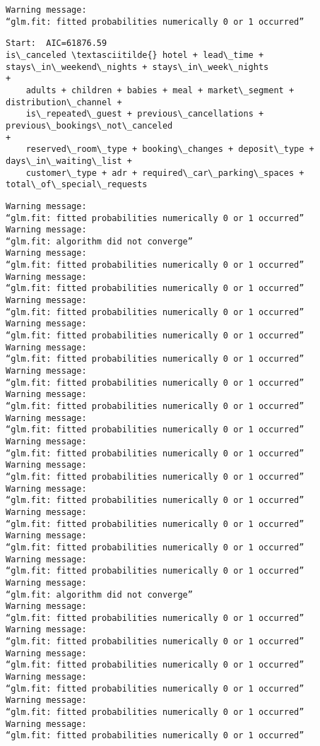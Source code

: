 \documentclass[11pt]{article}
\begin{document}
    \begin{Verbatim}[commandchars=\\\{\}]
Warning message:
“glm.fit: fitted probabilities numerically 0 or 1 occurred”
    \end{Verbatim}

    \begin{Verbatim}[commandchars=\\\{\}]
Start:  AIC=61876.59
is\_canceled \textasciitilde{} hotel + lead\_time + stays\_in\_weekend\_nights + stays\_in\_week\_nights
+
    adults + children + babies + meal + market\_segment + distribution\_channel +
    is\_repeated\_guest + previous\_cancellations + previous\_bookings\_not\_canceled
+
    reserved\_room\_type + booking\_changes + deposit\_type + days\_in\_waiting\_list +
    customer\_type + adr + required\_car\_parking\_spaces +
total\_of\_special\_requests

    \end{Verbatim}

    \begin{Verbatim}[commandchars=\\\{\}]
Warning message:
“glm.fit: fitted probabilities numerically 0 or 1 occurred”
Warning message:
“glm.fit: algorithm did not converge”
Warning message:
“glm.fit: fitted probabilities numerically 0 or 1 occurred”
Warning message:
“glm.fit: fitted probabilities numerically 0 or 1 occurred”
Warning message:
“glm.fit: fitted probabilities numerically 0 or 1 occurred”
Warning message:
“glm.fit: fitted probabilities numerically 0 or 1 occurred”
Warning message:
“glm.fit: fitted probabilities numerically 0 or 1 occurred”
Warning message:
“glm.fit: fitted probabilities numerically 0 or 1 occurred”
Warning message:
“glm.fit: fitted probabilities numerically 0 or 1 occurred”
Warning message:
“glm.fit: fitted probabilities numerically 0 or 1 occurred”
Warning message:
“glm.fit: fitted probabilities numerically 0 or 1 occurred”
Warning message:
“glm.fit: fitted probabilities numerically 0 or 1 occurred”
Warning message:
“glm.fit: fitted probabilities numerically 0 or 1 occurred”
Warning message:
“glm.fit: fitted probabilities numerically 0 or 1 occurred”
Warning message:
“glm.fit: fitted probabilities numerically 0 or 1 occurred”
Warning message:
“glm.fit: fitted probabilities numerically 0 or 1 occurred”
Warning message:
“glm.fit: algorithm did not converge”
Warning message:
“glm.fit: fitted probabilities numerically 0 or 1 occurred”
Warning message:
“glm.fit: fitted probabilities numerically 0 or 1 occurred”
Warning message:
“glm.fit: fitted probabilities numerically 0 or 1 occurred”
Warning message:
“glm.fit: fitted probabilities numerically 0 or 1 occurred”
Warning message:
“glm.fit: fitted probabilities numerically 0 or 1 occurred”
Warning message:
“glm.fit: fitted probabilities numerically 0 or 1 occurred”
    \end{Verbatim}
\end{document}
